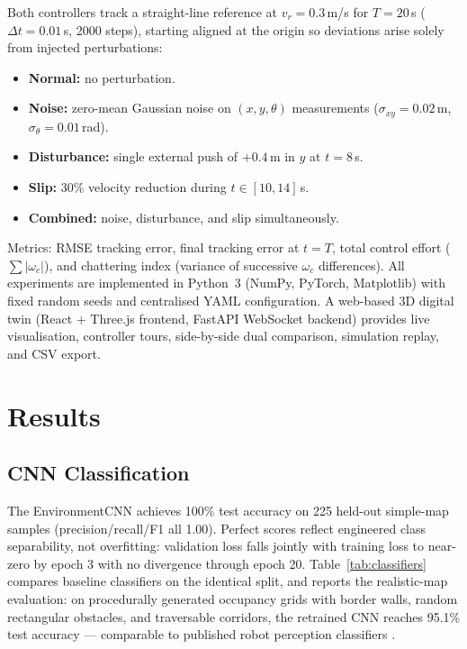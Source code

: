 \documentclass[11pt,a4paper]{article}
\begin{document}
Both controllers track a straight-line reference at $v_r = 0.3$\,m/s for $T = 20$\,s
($\Delta t = 0.01$\,s, 2000 steps), starting aligned at the origin so deviations arise
solely from injected perturbations:
\begin{itemize}
    \item \textbf{Normal:} no perturbation.
    \item \textbf{Noise:} zero-mean Gaussian noise on $(x, y, \theta)$ measurements
          ($\sigma_{xy} = 0.02$\,m, $\sigma_\theta = 0.01$\,rad).
    \item \textbf{Disturbance:} single external push of $+0.4$\,m in $y$ at $t = 8$\,s.
    \item \textbf{Slip:} 30\% velocity reduction during $t \in [10, 14]$\,s.
    \item \textbf{Combined:} noise, disturbance, and slip simultaneously.
\end{itemize}
Metrics: RMSE tracking error, final tracking error at $t = T$, total control effort
($\sum |\omega_c|$), and chattering index (variance of successive $\omega_c$ differences).
All experiments are implemented in Python~3 (NumPy, PyTorch, Matplotlib) with fixed random
seeds and centralised YAML configuration. A web-based 3D digital twin (React + Three.js
frontend, FastAPI WebSocket backend) provides live visualisation, controller tours,
side-by-side dual comparison, simulation replay, and CSV export.

\section{Results}

\subsection{CNN Classification}

The EnvironmentCNN achieves 100\% test accuracy on 225 held-out simple-map samples
(precision/recall/F1 all 1.00). Perfect scores reflect engineered class separability, not
overfitting: validation loss falls jointly with training loss to near-zero by epoch 3 with
no divergence through epoch 20. Table~\ref{tab:classifiers} compares baseline classifiers
on the identical split, and reports the realistic-map evaluation: on procedurally
generated occupancy grids with border walls, random rectangular obstacles, and traversable
corridors, the retrained CNN reaches 95.1\% test accuracy --- comparable to published
robot perception classifiers \cite{ran2024,demirtas2024}.
\end{document}
